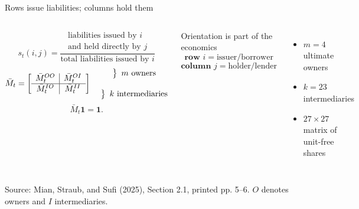 \documentclass[aspectratio=169,11pt]{beamer}
\newcommand{\source}[1]{%
  \vfill
  {\color{MSSGray}\fontsize{6.5}{7.5}\selectfont #1\par}
}
\begin{document}
\begin{frame}{Rows issue liabilities; columns hold them}
  \begin{columns}[T,onlytextwidth]
    \[
      s_t(i,j)
      =
      \frac{
        \substack{\text{liabilities issued by }i\\
                  \text{and held directly by }j}
      }{
        \text{total liabilities issued by }i
      }
    \]
    \[
      \bar M_t=
      \left[
      \begin{array}{c|c}
        \bar M_t^{OO} & \bar M_t^{OI}\\ \hline
        \bar M_t^{IO} & \bar M_t^{II}
      \end{array}
      \right]
      \quad
      \begin{matrix}
        \left.\vphantom{\bar M_t^{OO}}\right\}\ m\text{ owners}\\[0.45cm]
        \left.\vphantom{\bar M_t^{II}}\right\}\ k\text{ intermediaries}
      \end{matrix}
    \]
    \[
      \bar M_t\mathbf 1=\mathbf 1.
    \]

    \begin{block}{Orientation is part of the economics}
      \[
        \textbf{row }i=\text{issuer/borrower}
      \]
      \[
        \textbf{column }j=\text{holder/lender}
      \]
    \end{block}
    \vspace{0.2cm}
    \begin{itemize}
      \item \(m=4\) ultimate owners
      \item \(k=23\) intermediaries
      \item \(27\times27\) matrix of unit-free shares
    \end{itemize}
  \end{columns}
  \source{Source: Mian, Straub, and Sufi (2025), Section 2.1, printed pp. 5--6. \(O\) denotes owners and \(I\) intermediaries.}
\end{frame}
\end{document}
